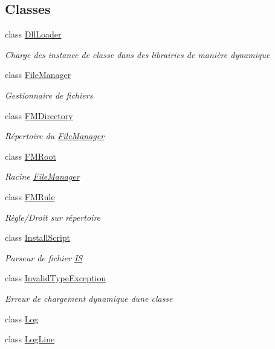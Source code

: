 \subsection*{Classes}
\begin{DoxyCompactItemize}
\item 
class \mbox{\hyperlink{class_n_t_k_1_1_i_o_1_1_dll_loader}{Dll\+Loader}}
\begin{DoxyCompactList}\small\item\em Charge des instance de classe dans des librairies de manière dynamique \end{DoxyCompactList}\item 
class \mbox{\hyperlink{class_n_t_k_1_1_i_o_1_1_file_manager}{File\+Manager}}
\begin{DoxyCompactList}\small\item\em Gestionnaire de fichiers \end{DoxyCompactList}\item 
class \mbox{\hyperlink{class_n_t_k_1_1_i_o_1_1_f_m_directory}{F\+M\+Directory}}
\begin{DoxyCompactList}\small\item\em Répertoire du \mbox{\hyperlink{class_n_t_k_1_1_i_o_1_1_file_manager}{File\+Manager}} \end{DoxyCompactList}\item 
class \mbox{\hyperlink{class_n_t_k_1_1_i_o_1_1_f_m_root}{F\+M\+Root}}
\begin{DoxyCompactList}\small\item\em Racine \mbox{\hyperlink{class_n_t_k_1_1_i_o_1_1_file_manager}{File\+Manager}} \end{DoxyCompactList}\item 
class \mbox{\hyperlink{class_n_t_k_1_1_i_o_1_1_f_m_rule}{F\+M\+Rule}}
\begin{DoxyCompactList}\small\item\em Règle/\+Droit sur répertoire \end{DoxyCompactList}\item 
class \mbox{\hyperlink{class_n_t_k_1_1_i_o_1_1_install_script}{Install\+Script}}
\begin{DoxyCompactList}\small\item\em Parseur de fichier \mbox{\hyperlink{namespace_n_t_k_1_1_i_o_1_1_i_s}{IS}} \end{DoxyCompactList}\item 
class \mbox{\hyperlink{class_n_t_k_1_1_i_o_1_1_invalid_type_exception}{Invalid\+Type\+Exception}}
\begin{DoxyCompactList}\small\item\em Erreur de chargement dynamique d\textquotesingle{}une classe \end{DoxyCompactList}\item 
class \mbox{\hyperlink{class_n_t_k_1_1_i_o_1_1_log}{Log}}
\item 
class \mbox{\hyperlink{class_n_t_k_1_1_i_o_1_1_log_line}{Log\+Line}}
\end{DoxyCompactItemize}
